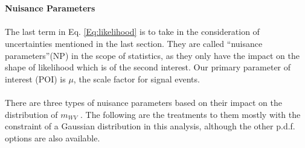 \\
\\{\bf Nuisance Parameters}
\\
\\The last term in Eq. \ref{Eq:likelihood} is to take in the consideration of uncertainties mentioned in the last section. They are called ``nuisance parameters''(NP) in the scope of statistics, as they only have the impact on the shape of likelihood which is of the second interest. Our primary parameter of interest (POI) is $\mu$, the scale factor for signal events.
\\
\\There are three types of nuisance parameters based on their impact on the distribution of $m_{WV}$ \cite{NuiTreats}. The following are the treatments to them mostly with the constraint of a Gaussian distribution in this analysis, although the other p.d.f. options are also available. 
